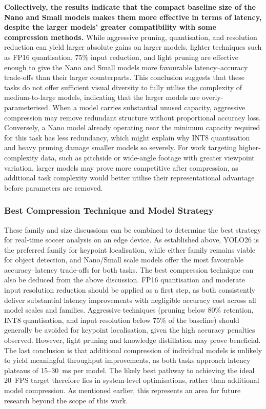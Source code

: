 \textbf{Collectively, the results indicate that the compact baseline size of the Nano and Small models makes them more effective in terms of latency, despite the larger models' greater compatibility with some compression methods.} While aggressive pruning, quantisation, and resolution reduction can yield larger absolute gains on larger models, lighter techniques such as FP16 quantisation, 75\% input reduction, and light pruning are effective enough to give the Nano and Small models more favourable latency--accuracy trade-offs than their larger counterparts. This conclusion suggests that these tasks do not offer sufficient visual diversity to fully utilise the complexity of medium-to-large models, indicating that the larger models are overly-parameterised. When a model carries substantial unused capacity, aggressive compression may remove redundant structure without proportional accuracy loss. Conversely, a Nano model already operating near the minimum capacity required for this task has less redundancy, which might explain why INT8 quantisation and heavy pruning damage smaller models so severely. For work targeting higher-complexity data, such as pitchside or wide-angle footage with greater viewpoint variation, larger models may prove more competitive after compression, as additional task complexity would better utilise their representational advantage before parameters are removed.

\subsubsection{Best Compression Technique and Model Strategy}

These family and size discussions can be combined to determine the best strategy for real-time soccer analysis on an edge device. As established above, YOLO26 is the preferred family for keypoint localisation, while either family remains viable for object detection, and Nano/Small scale models offer the most favourable accuracy--latency trade-offs for both tasks. The best compression technique can also be deduced from the above discussion. FP16 quantisation and moderate input resolution reduction should be applied as a first step, as both consistently deliver substantial latency improvements with negligible accuracy cost across all model scales and families. Aggressive techniques (pruning below 80\% retention, INT8 quantisation, and input resolution below 75\% of the baseline) should generally be avoided for keypoint localisation, given the high accuracy penalties observed. However, light pruning and knowledge distillation may prove beneficial. The last conclusion is that additional compression of individual models is unlikely to yield meaningful throughput improvements, as both tasks approach latency plateaus of 15--30~ms per model. The likely best pathway to achieving the ideal 20~FPS target therefore lies in system-level optimisations, rather than additional model compression. As mentioned earlier, this represents an area for future research beyond the scope of this work.

